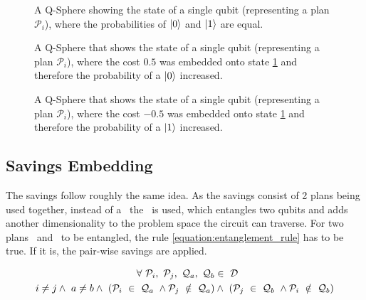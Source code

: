 \begin{figure}[!h]
    \centering
    \scalebox{\histogramwidth}{
        
    }
    \caption{A Q-Sphere showing the state of a single qubit (representing a plan $\mathcal{P}_i$), where the probabilities of $\ket{0}$ and $\ket{1}$ are equal.}
    \label{figure:q_sphere_no_cost}
\end{figure}

\begin{figure}[!h]
    \centering
    \scalebox{\histogramwidth}{
        
    }
    \caption{A Q-Sphere that shows the state of a single qubit (representing a plan $\mathcal{P}_i$), where the cost $0.5$ was embedded onto state \ref{figure:q_sphere_no_cost} and therefore the probability of a $\ket{0}$ increased.}
    \label{figure:q_sphere_bad_cost}
\end{figure}

\begin{figure}[!h]
    \centering
    \scalebox{\histogramwidth}{
        
    }
    \caption{A Q-Sphere that shows the state of a single qubit (representing a plan $\mathcal{P}_i$), where the cost $-0.5$ was embedded onto state \ref{figure:q_sphere_no_cost} and therefore the probability of a $\ket{1}$ increased.}
    \label{figure:q_sphere_good_cost}
\end{figure}

\newpage

\subsection{Savings Embedding}

The savings follow roughly the same idea. As the savings consist of 2 plans being used together, instead of a \rygate\ the \crzgate\ is used, which entangles two qubits and adds another dimensionality to the problem space the circuit can traverse. For two plans \plani\ and \planj\ to be entangled, the rule \ref{equation:entanglement_rule} has to be true. If it is, the pair-wise savings are applied.

\begin{equation}
\centering
    \begin{split}
        \forall\  \mathcal{P}_i,\ \mathcal{P}_j,\ \mathcal{Q}_a,\ \mathcal{Q}_b &\in\ \mathcal{D}\ \\ 
        i \neq j \wedge\ a \neq b \wedge\ \left(\mathcal{P}_i\ \in\ \mathcal{Q}_a\ \wedge \mathcal{P}_j\ \notin\ \mathcal{Q}_a\right) &\wedge\ \left(\mathcal{P}_j\ \in\ \mathcal{Q}_b\ \wedge \mathcal{P}_i\ \notin\ \mathcal{Q}_b\right)\\
    \end{split}
    \label{equation:entanglement_rule}
\end{equation}



